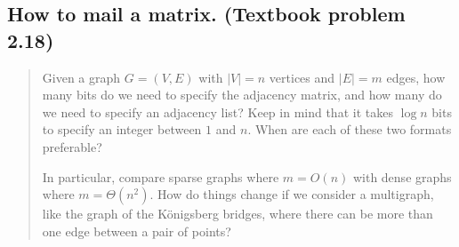 
\subsection*{How to mail a matrix. (Textbook problem 2.18)}
    \begin{quote}
    Given a graph $G = (V, E)$ with $|V| = n$ vertices and $|E| = m$ edges, how many bits do we need to specify the adjacency matrix, and how many do we need to specify an adjacency list? Keep in mind that it takes $\log n$ bits to specify an integer between $1$ and $n$. When are each of these two formats preferable?

    In particular, compare sparse graphs where $m = O(n)$ with dense graphs where $m = \Theta(n^2)$. How do things change if we consider a multigraph, like the graph of the K\"{o}nigsberg bridges, where there can be more than one edge between a pair of points?
    \end{quote}
